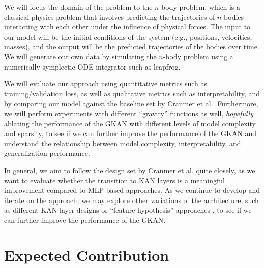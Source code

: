 \documentclass[11pt]{article}
\begin{document}
We will focus the domain of the problem to the $n$-body problem, which is a classical physics problem that involves predicting the trajectories of $n$ bodies interacting with each other under the influence of physical forces. The input to our model will be the initial conditions of the system (e.g., positions, velocities, masses), and the output will be the predicted trajectories of the bodies over time. We will generate our own data by simulating the $n$-body problem using a numerically symplectic ODE integrator such as leapfrog.

We will evaluate our approach using quantitative metrics
such as training/validation loss, as well as qualitative metrics such as interpretability, and by comparing our model against the baseline set by Cranmer et al.\cite{cranmer2020discoveringsymbolicmodelsdeep}. Furthermore, we will perform experiments with different ``gravity'' functions as well, \textit{hopefully} ablating the performance of the GKAN with different levels of model complexity and sparsity, to see if we can further improve the performance of the GKAN and understand the relationship between model complexity, interpretability, and generalization performance.

In general, we aim to follow the design set by Cranmer et al.\cite{cranmer2020discoveringsymbolicmodelsdeep} quite closely, as we want to evaluate
whether the transition to KAN layers is a meaningful improvement compared to MLP-based approaches. As we
continue to develop and iterate on the approach, we may explore other variations of the architecture, such as different KAN layer designs or ``feature hypothesis'' approaches \cite{liu2024kan20kolmogorovarnoldnetworks}, to see if we can further improve the performance of the GKAN.


\section{Expected Contribution}

%

\end{document}
